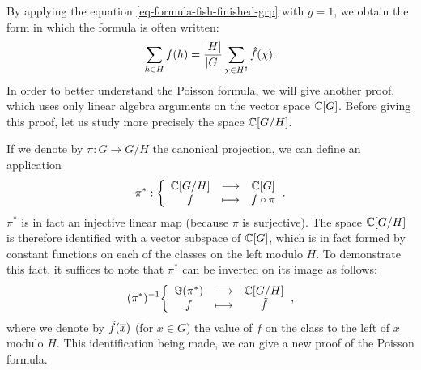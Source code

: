 By applying the equation \eqref{eq-formula-fish-finished-grp} with $ g = 1 $, we obtain the form in which the formula is often written:
\begin{equation}
\label{eq-formula-fish-group-finite-simple}
\sum_{h \in H}{f(h)} = \frac{| H |}{|G|} \sum_{\chi \in H^{\sharp}}{\hat{f} (\chi )}.
\end{equation}
In order to better understand the Poisson formula, we will give another proof, which uses only linear algebra arguments on the vector space $ \mathbb{C} [G] $. Before giving this proof, let us study more precisely the space $ \mathbb{C} [G / H] $.
 
If we denote by $ \pi: G \rightarrow G / H $ the canonical projection, we can define an application
\begin{equation*}
\pi^*: {\left\{ \begin{array}{ccc} \mathbb{C} [G / H] & \longrightarrow & \mathbb{C} [G] \\ f & \longmapsto & f \circ \pi \end{array} \right.}.
\end{equation*}
$ \pi^* $ is in fact an injective linear map (because $ \pi $ is surjective). The space $ \mathbb{C} [G / H] $ is therefore identified with a vector subspace of $ \mathbb{C} [G] $, which is in fact formed by constant functions on each of the classes on the left modulo $ H $. To demonstrate this fact, it suffices to note that $ \pi^* $ can be inverted on its image as follows:
\begin{equation*}
(\pi^*)^{-1} {\left\{ \begin{array}{ccc} \Im (\pi^*) & \longrightarrow & \mathbb{C} [G / H] \\ f & \longmapsto & \tilde{f} \end{array} \right.},
\end{equation*}
where we denote by $ \tilde{f} (\overline{x}) $ (for $ x \in G $) the value of $ f $ on the class to the left of $ x $ modulo $ H $. This identification being made, we can give a new proof of the Poisson formula.
 
